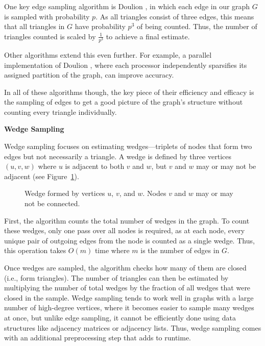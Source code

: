 \documentclass[11pt]{article}
\newcommand{\subsubsubsection}[1]{
  \vspace{1em} %
  \noindent\textbf{#1} %
  \vspace{0.5em} %
}
\begin{document}
One key edge sampling algorithm is Doulion \cite{tsourakakis_doulion_2009}, in which each edge in our graph $G$ is sampled with probability $p$.
As all triangles consist of three edges, this means that all triangles in $G$ have probability $p^3$ of being counted.
Thus, the number of triangles counted is scaled by $\frac{1}{p^3}$ to achieve a final estimate.

Other algorithms extend this even further.
For example, a parallel implementation of Doulion \cite{arifuzzaman_parallel_2012}, where each processor independently sparsifies its assigned partition of the graph, can improve accuracy.

In all of these algorithms though, the key piece of their efficiency and efficacy is the sampling of edges to get a good picture of the graph's structure without counting every triangle individually.

\subsubsubsection{Wedge Sampling}

Wedge sampling \cite{seshadhri_triadic_2013} focuses on estimating wedges—triplets of nodes that form two edges but not necessarily a triangle.
A wedge is defined by three vertices $(u, v, w)$ where $u$ is adjacent to both $v$ and $w$, but $v$ and $w$ may or may not be adjacent (see Figure~\ref{fig:wedge_diagram}).

\begin{figure}[h]
    \centering
    \caption{Wedge formed by vertices $u$, $v$, and $w$. Nodes $v$ and $w$ may or may not be connected.}
    \label{fig:wedge_diagram}
\end{figure}

First, the algorithm counts the total number of wedges in the graph.
To count these wedges, only one pass over all nodes is required, as at each node, every unique pair of outgoing edges from the node is counted as a single wedge.
Thus, this operation takes $O(m)$ time where $m$ is the number of edges in $G$.

Once wedges are sampled, the algorithm checks how many of them are closed (i.e., form triangles).
The number of triangles can then be estimated by multiplying the number of total wedges by the fraction of all wedges that were closed in the sample.
Wedge sampling tends to work well in graphs with a large number of high-degree vertices, where it becomes easier to sample many wedges at once, but unlike edge sampling, it cannot be efficiently done using data structures like adjacency matrices or adjacency lists.
Thus, wedge sampling comes with an additional preprocessing step that adds to runtime.
\end{document}
